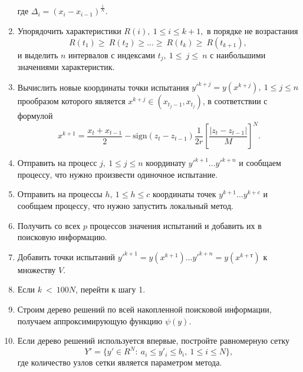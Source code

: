 \documentclass[runningheads]{llncs}
\begin{document}
\begin{enumerate}
	где \(\Delta_i=(x_i-x_{i-1})^\frac{1}{N}\).
	
	\item   Упорядочить характеристики $R\left(i\right),\ 1\leq i \leq k+1,$ в порядке не возрастания
	\begin{equation} 
		\label{agp4_R_sort} 	R\left(t_1\right)\geq\ R\left(t_2\right)\geq...\geq\ R\left(t_k\right)\geq\ R(t_{k+1}),\  
	\end{equation} 
	и выделить $n$ интервалов с индексами $t_j,\ 1\le\ j\le\ n$  с наибольшими значениями характеристик.	
	
	\item Вычислить новые координаты точки испытания $y'^{k+j}=y\left(x^{k+j}\right), \ 1\leq j\leq n$ прообразом которого является $x^{k+j}\in\left(x_{t_j-1},x_{t_j}\right)$, в соответствии с формулой
	\begin{equation}
		\label{agp5_x1}
		x^{k+1}=\frac{x_t+x_{t-1}}{2}-\mathrm{sign}\left(z_t-z_{t-1}\right)\frac{1}{2r}\left[\frac{\left|z_t-z_{t-1}\right|}{M}\right]^N.
	\end{equation}	
	
	
	\item Отправить на процесс $j, \ 1\leq j\leq n$ координату $y'^{k+1} ... y'^{k+n}$  и сообщаем процессу, что нужно произвести одиночное испытание.
	
	\item Отправить на процессы $h, \ 1\leq h\leq c$ координаты точек $y^{k+1} ... y^{k+c}$ и сообщаем процессу, что нужно запустить локальный метод.
	
	\item Получить со всех $p$ процессов значения испытаний и добавить их в поисковую информацию.
	
	\item Добавить точки испытаний $y'^{k+1}=y\left(x^{k+1}\right) ... y'^{k+n}=y\left(x^{k+т}\right)$ к множеству $V$.
	
	\item Если $k\ <\ 100 N$, перейти к шагу 1.
	
	
	\item Строим дерево решений по всей накопленной поисковой информации, получаем аппроксимирующую функцию $\psi(y)$.
	
	\item Если дерево решений используется впервые, постройте равномерную сетку
	\begin{displaymath} 
		Y'=\{ y'\in R^N:\ a_i\le y'_i \le b_i,\ 1\le i\le N \},
	\end{displaymath} 
	где количество узлов сетки является параметром метода.
	

\end{enumerate}
\end{document}
